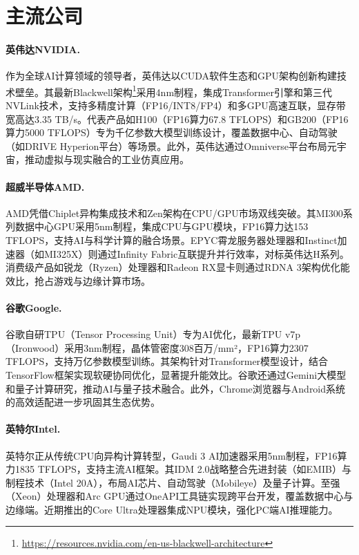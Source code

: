 \documentclass{article}
\begin{document}
\section{主流公司}
\paragraph{英伟达NVIDIA.}
作为全球AI计算领域的领导者，英伟达以CUDA软件生态和GPU架构创新构建技术壁垒。其最新Blackwell架构\footnote{\url{https://resources.nvidia.com/en-us-blackwell-architecture}}采用4nm制程，集成Transformer引擎和第三代NVLink技术，支持多精度计算（FP16/INT8/FP4）和多GPU高速互联，显存带宽高达3.35 TB/s\cite{tirumala2024nvidia}。代表产品如H100（FP16算力67.8 TFLOPS）和GB200（FP16算力5000 TFLOPS）专为千亿参数大模型训练设计，覆盖数据中心、自动驾驶（如DRIVE Hyperion平台）等场景。此外，英伟达通过Omniverse平台布局元宇宙，推动虚拟与现实融合的工业仿真应用\cite{hummel2019leveraging,vatanen2024exploring}。
\paragraph{超威半导体AMD.}
AMD凭借Chiplet异构集成技术和Zen架构在CPU/GPU市场双线突破\cite{schone2021energy}。其MI300系列数据中心GPU采用5nm制程，集成CPU与GPU模块，FP16算力达153 TFLOPS，支持AI与科学计算的融合场景。EPYC霄龙服务器处理器和Instinct加速器（如MI325X）则通过Infinity Fabric互联提升并行效率，对标英伟达H系列。消费级产品如锐龙（Ryzen）处理器和Radeon RX显卡则通过RDNA 3架构优化能效比，抢占游戏与边缘计算市场。
\paragraph{谷歌Google.}
谷歌自研TPU（Tensor Processing Unit）专为AI优化，最新TPU v7p（Ironwood）采用3nm制程，晶体管密度308百万/mm²，FP16算力2307 TFLOPS，支持万亿参数模型训练\cite{kumar2019scale}。其架构针对Transformer模型设计，结合TensorFlow框架实现软硬协同优化，显著提升能效比。谷歌还通过Gemini大模型和量子计算研究，推动AI与量子技术融合。此外，Chrome浏览器与Android系统的高效适配进一步巩固其生态优势。
\paragraph{英特尔Intel.}
英特尔正从传统CPU向异构计算转型，Gaudi 3 AI加速器采用5nm制程，FP16算力1835 TFLOPS，支持主流AI框架\cite{zhang2023benchmarking}。其IDM 2.0战略整合先进封装（如EMIB）与制程技术（Intel 20A），布局AI芯片、自动驾驶（Mobileye）及量子计算。至强（Xeon）处理器和Arc GPU通过OneAPI工具链实现跨平台开发，覆盖数据中心与边缘端。近期推出的Core Ultra处理器集成NPU模块，强化PC端AI推理能力。
\end{document}
